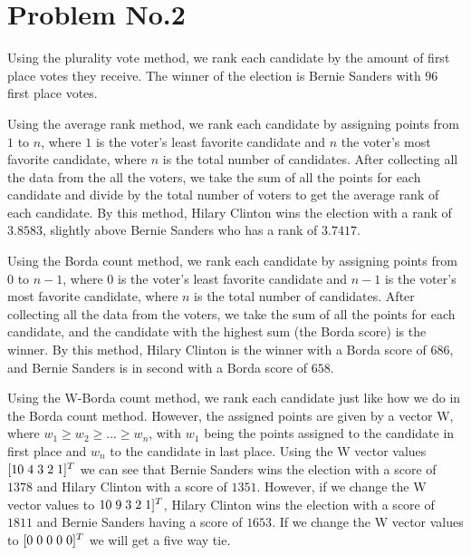 \section*{Problem No.2} \label{sec:prob2}
Using the plurality vote method, we rank each candidate by the amount of first place votes they receive. The winner of the election is Bernie Sanders with $96$ first place votes.\vspace{1pc}

\noindent Using the average rank method, we rank each candidate by assigning points from $1$ to $n$, where $1$ is the voter's least favorite candidate and $n$ the voter's most favorite candidate, where $n$ is the total number of candidates. After collecting all the data from the all the voters, we take the sum of all the points for each candidate and divide by the total number of voters to get the average rank of each candidate. By this method, Hilary Clinton wins the election with a rank of $3.8583$, slightly above Bernie Sanders who has a rank of $3.7417$.\vspace{1pc}

\noindent Using the Borda count method, we rank each candidate by assigning points from $0$ to $n-1$, where $0$ is the voter's least favorite candidate and $n-1$ is the voter's most favorite candidate, where $n$ is the total number of candidates. After collecting all the data from the voters, we take the sum of all the points for each candidate, and the candidate with the highest sum (the Borda score) is the winner. By this method, Hilary Clinton is the winner with a Borda score of $686$, and Bernie Sanders is in second with a Borda score of $658$.\vspace{1pc}

\noindent Using the W-Borda count method, we rank each candidate just like how we do in the Borda count method. However, the assigned points are given by a vector W, where $w_1 \geq w_2 \geq ... \geq w_n$, with $w_1$ being the points assigned to the candidate in first place and $w_n$ to the candidate in last place. Using the W vector values $[10\hspace{1mm} 4\hspace{1mm} 3\hspace{1mm} 2\hspace{1mm} 1]^T$ we can see that Bernie Sanders wins the election with a score of $1378$ and Hilary Clinton with a score of $1351$. However, if we change the W vector values to $10\hspace{1mm} 9\hspace{1mm} 3\hspace{1mm} 2\hspace{1mm} 1]^T$, Hilary Clinton wins the election with a score of $1811$ and Bernie Sanders having a score of $1653$. If we change the W vector values to $[0\hspace{1mm} 0\hspace{1mm} 0\hspace{1mm} 0\hspace{1mm} 0]^T$ we will get a five way tie.\vspace{1pc}

